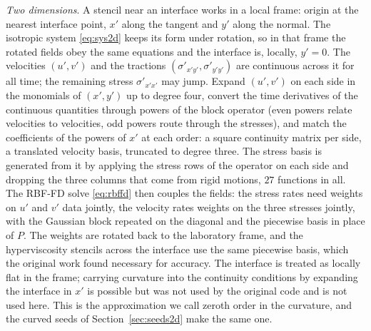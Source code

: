 \documentclass[11pt]{amsart}
\theoremstyle{definition}
\theoremstyle{remark}
\newcommand{\para}[1]{\par\smallskip\noindent\textit{#1}.\enspace}
\begin{document}
\para{Two dimensions}
A stencil near an interface works in a local frame: origin at the
nearest interface point, $x'$ along the tangent and $y'$ along the
normal. The isotropic system \eqref{eq:sys2d} keeps its form under
rotation, so in that frame the rotated fields obey the same equations
and the interface is, locally, $y' = 0$. The velocities $(u', v')$ and
the tractions $(\sigma'_{x'y'}, \sigma'_{y'y'})$ are continuous across
it for all time; the remaining stress $\sigma'_{x'x'}$ may jump. Expand
$(u', v')$ on each side in the monomials of $(x', y')$ up to degree
four, convert the time derivatives of the continuous quantities through
powers of the block operator (even powers relate velocities to
velocities, odd powers route through the stresses), and match the
coefficients of the powers of $x'$ at each order: a square continuity
matrix per side, a translated velocity basis, truncated to degree three.
The stress basis is generated from it by applying the stress rows of the
operator on each side and dropping the three columns that come from
rigid motions, $27$ functions in all. The RBF-FD solve
\eqref{eq:rbffd} then couples the fields: the stress rates need weights
on $u'$ and $v'$ data jointly, the velocity rates weights on the three
stresses jointly, with the Gaussian block repeated on the diagonal and
the piecewise basis in place of $P$. The weights are rotated back to the
laboratory frame, and the hyperviscosity stencils across the interface
use the same piecewise basis, which the original work found necessary
for accuracy. The interface is treated as locally flat in the frame;
carrying curvature into the continuity conditions by expanding the
interface in $x'$ is possible \cite{MartinFornberg2017} but was not used
by the original code and is not used here. This is the approximation we
call zeroth order in the curvature, and the curved seeds of
Section~\ref{sec:seeds2d} make the same one.
\end{document}
